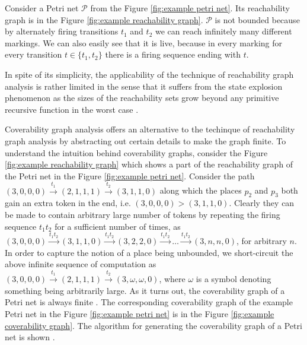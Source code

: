 \begin{example}
  Consider a Petri net $\mathcal P$ from the Figure \ref{fig:example petri net}. Its reachability graph is in the Figure \ref{fig:example reachability graph}. $\mathcal P$ is not bounded because by alternately firing transitions $t_1$ and $t_2$ we can reach infinitely many different markings. We can also easily see that it is live, because in every marking for every transition $t\in\{t_1, t_2\}$ there is a firing sequence ending with $t$.
\end{example}

In spite of its simplicity, the applicability of the technique of reachability graph analysis is rather limited in the sense that it suffers from the state explosion phenomenon as the sizes of the reachability sets grow beyond any primitive recursive function in the worst case \cite{Yen06PetriNets}.

Coverability graph analysis offers an alternative to the techinque of reachability graph analysis by abstracting out certain details to make the graph finite. To understand the intuition behind coverability graphs, consider the Figure \ref{fig:example reachability graph} which shows a part of the reachability graph of the Petri net in the Figure \ref{fig:example petri net}. Consider the path $(3,0,0,0)\xrightarrow{t_1}(2,1,1,1)\xrightarrow{t_2}(3,1,1,0)$ along which the places $p_2$ and $p_3$ both gain an extra token in the end, i.e. $(3,0,0,0) > (3,1,1,0)$. Clearly they can be made to contain arbitrary large number of tokens by repeating the firing sequence $t_1t_2$ for a sufficient number of times, as $(3,0,0,0)\xrightarrow{t_1t_2}(3,1,1,0)\xrightarrow{t_1t_2}(3,2,2,0)\xrightarrow{t_1t_2}\ldots\xrightarrow{t_1t_2}(3,n,n,0)$, for arbitrary $n$. In order to capture the notion of a place being unbounded, we short-circuit the above infinite sequence of computation as $(3,0,0,0)\xrightarrow{t_1}(2,1,1,1)\xrightarrow{t_2}(3,\omega,\omega,0)$, where $\omega$ is a symbol denoting something being arbitrarily large. As it turns out, the coverability graph of a Petri net is always finite \cite{Karp69ParallelProgramSchemata}. The corresponding coverability graph of the example Petri net in the Figure \ref{fig:example petri net} is in the Figure \ref{fig:example coverability graph}. The algorithm for generating the coverability graph of a Petri net \cite{Yen06PetriNets} is shown .

